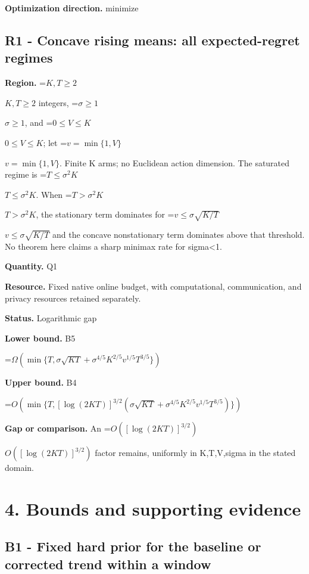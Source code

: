 \documentclass[10pt,a4paper]{article}
\newcommand{\AtlasMath}[1]{\par\begingroup\centering\setbox0=\hbox{$\displaystyle #1$}\ifdim\wd0>1.4\linewidth\typeout{ATLAS WIDE FORMULA: \the\wd0}\fi\ifdim\wd0>\linewidth\resizebox{\linewidth}{!}{\box0}\else\box0\fi\par\endgroup}
\newcommand{\AtlasInlineMath}[1]{\begingroup\setbox0=\hbox{$#1$}\ifdim\wd0>.4\linewidth\endgroup\AtlasMath{#1}\else\endgroup$#1$\fi}
\begin{document}
\textbf{Optimization direction.} minimize



\subsection{R1 - Concave rising means: all expected-regret regimes}


\textbf{Region.} \AtlasInlineMath{K,T\ge2} integers, \AtlasInlineMath{\sigma\ge1}, and \AtlasInlineMath{0\le V\le K}; let \AtlasInlineMath{v=\min\{1,V\}}. Finite K arms; no Euclidean action dimension. The saturated regime is \AtlasInlineMath{T\le\sigma^2K}. When \AtlasInlineMath{T>\sigma^2K}, the stationary term dominates for \AtlasInlineMath{v\le\sigma\sqrt{K/T}} and the concave nonstationary term dominates above that threshold. No theorem here claims a sharp minimax rate for sigma<1.



\textbf{Quantity.} Q1



\textbf{Resource.} Fixed native online budget, with computational, communication, and privacy resources retained separately.



\textbf{Status.} Logarithmic gap



\textbf{Lower bound.} B5



\AtlasMath{\Omega\!\left(\min\{T,\sigma\sqrt{KT}+\sigma^{4/5}K^{2/5}v^{1/5}T^{3/5}\}\right)}


\textbf{Upper bound.} B4



\AtlasMath{O\!\left(\min\{T,[\log(2KT)]^{3/2}(\sigma\sqrt{KT}+\sigma^{4/5}K^{2/5}v^{1/5}T^{3/5})\}\right)}


\textbf{Gap or comparison.} An \AtlasInlineMath{O([\log(2KT)]^{3/2})} factor remains, uniformly in K,T,V,sigma in the stated domain.



\section{4. Bounds and supporting evidence}


\subsection{B1 - Fixed hard prior for the baseline or corrected trend within a window}
\end{document}
